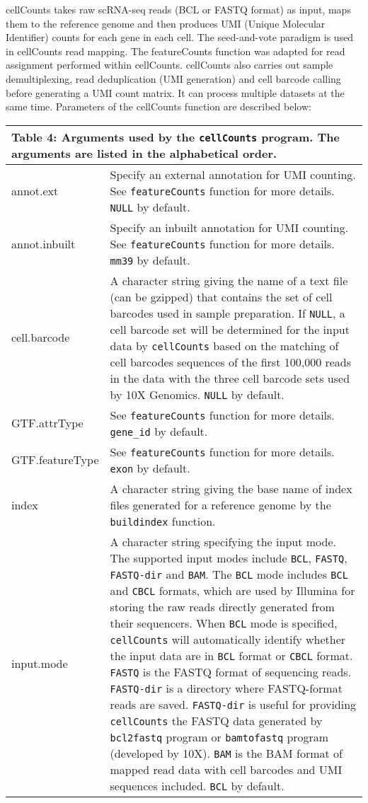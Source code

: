 \documentclass[12pt]{report}
\newcommand{\code}[1]{{\small\texttt{#1}}}
\newcommand{\featureCounts}{\textsf{featureCounts}}
\newcommand{\cellCounts}{\textsf{cellCounts}}
\begin{document}
{\cellCounts} takes raw scRNA-seq reads (BCL or FASTQ format) as input, maps them to the reference genome and then produces UMI (Unique Molecular Identifier) counts for each gene in each cell. 
The seed-and-vote paradigm is used in {\cellCounts} read mapping. 
The {\featureCounts} function was adapted for read assignment performed within {\cellCounts}. 
{\cellCounts} also carries out sample demultiplexing, read deduplication (UMI generation) and cell barcode calling before generating a UMI count matrix. 
It can process multiple datasets at the same time.
Parameters of the {\cellCounts} function are described below:

\begin{longtable}{|p{4.5cm}|p{11cm}|}
\multicolumn{2}{p{16cm}}{Table 4: Arguments used by the \code{cellCounts} program.
The arguments are listed in the alphabetical order.}
\endfirsthead
\hline
Arguments & Description \\
\hline
annot.ext & Specify an external annotation for UMI counting. See \code{featureCounts} function for more details. \code{NULL} by default.\\
\hline
annot.inbuilt & Specify an inbuilt annotation for UMI counting. See \code{featureCounts} function for more details. \code{mm39} by default.\\
\hline
cell.barcode & A character string giving the name of a text file (can be gzipped) that contains the set of cell barcodes used in sample preparation. If \code{NULL}, a cell barcode set will be determined for the input data by \code{cellCounts} based on the matching of cell barcodes sequences of the first 100,000 reads in the data with the three cell barcode sets used by 10X Genomics. \code{NULL} by default.\\
\hline
GTF.attrType & See \code{featureCounts} function for more details. \code{gene\_id} by default. \\
\hline
GTF.featureType & See \code{featureCounts} function for more details. \code{exon} by default. \\
\hline
index & A character string giving the base name of index files generated for a reference genome by the \code{buildindex} function. \\
\hline
input.mode & A character string specifying the input mode. The supported input modes include \code{BCL}, \code{FASTQ}, \code{FASTQ-dir} and \code{BAM}. The \code{BCL} mode includes \code{BCL} and \code{CBCL} formats, which are used by Illumina for storing the raw reads directly generated from their sequencers. When \code{BCL} mode is specified, \code{cellCounts} will automatically identify whether the input data are in \code{BCL} format or \code{CBCL} format. \code{FASTQ} is the FASTQ format of sequencing reads. \code{FASTQ-dir} is a directory where FASTQ-format reads are saved. \code{FASTQ-dir} is useful for providing \code{cellCounts} the FASTQ data generated by \code{bcl2fastq} program or \code{bamtofastq} program (developed by 10X). \code{BAM} is the BAM format of mapped read data with cell barcodes and UMI sequences included. \code{BCL} by default.\\

\end{longtable}
\end{document}
